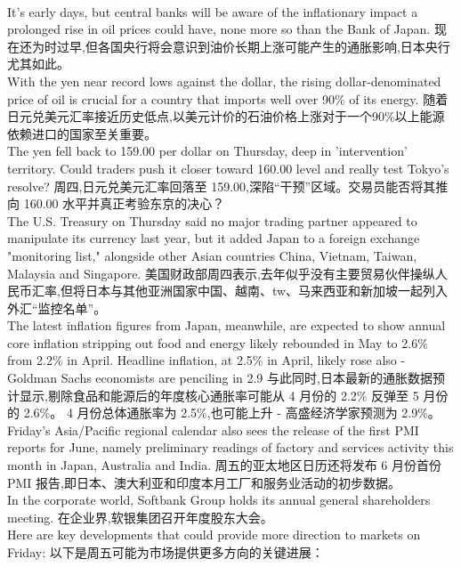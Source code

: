 \documentclass[a4paper,12pt]{article}
\begin{document}
\\It's early days, but central banks will be aware of the inflationary impact a prolonged rise in oil prices could have, none more so than the Bank of Japan.
现在还为时过早,但各国央行将会意识到油价长期上涨可能产生的通胀影响,日本央行尤其如此。
\\With the yen near record lows against the dollar, the rising dollar-denominated price of oil is crucial for a country that imports well over 90\% of its energy.
随着日元兑美元汇率接近历史低点,以美元计价的石油价格上涨对于一个90\%以上能源依赖进口的国家至关重要。
\\The yen fell back to 159.00 per dollar on Thursday, deep in 'intervention' territory. Could traders push it closer toward 160.00 level and really test Tokyo's resolve?
周四,日元兑美元汇率回落至 159.00,深陷“干预”区域。交易员能否将其推向 160.00 水平并真正考验东京的决心？
\\The U.S. Treasury on Thursday said no major trading partner appeared to manipulate its currency last year, but it added Japan to a foreign exchange "monitoring list," alongside other Asian countries China, Vietnam, Taiwan, Malaysia and Singapore.
美国财政部周四表示,去年似乎没有主要贸易伙伴操纵人民币汇率,但将日本与其他亚洲国家中国、越南、tw、马来西亚和新加坡一起列入外汇“监控名单”。
\\The latest inflation figures from Japan, meanwhile, are expected to show annual core inflation stripping out food and energy likely rebounded in May to 2.6\% from 2.2\% in April. Headline inflation, at 2.5\% in April, likely rose also - Goldman Sachs economists are penciling in 2.9%
与此同时,日本最新的通胀数据预计显示,剔除食品和能源后的年度核心通胀率可能从 4 月份的 2.2\% 反弹至 5 月份的 2.6\%。 4 月份总体通胀率为 2.5\%,也可能上升 - 高盛经济学家预测为 2.9\%。
\\Friday's Asia/Pacific regional calendar also sees the release of the first PMI reports for June, namely preliminary readings of factory and services activity this month in Japan, Australia and India.
周五的亚太地区日历还将发布 6 月份首份 PMI 报告,即日本、澳大利亚和印度本月工厂和服务业活动的初步数据。
\\In the corporate world, Softbank Group holds its annual general shareholders meeting.
在企业界,软银集团召开年度股东大会。
\\Here are key developments that could provide more direction to markets on Friday:
以下是周五可能为市场提供更多方向的关键进展：
\end{document}
